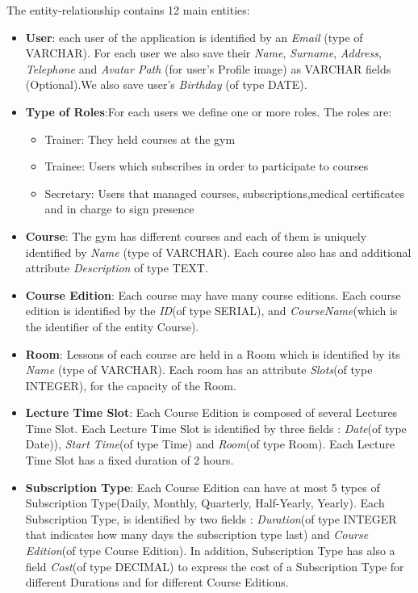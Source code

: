     The entity-relationship contains 12 main entities:
    \begin{itemize}
        \item 
        \textbf{User}: each user of the application is identified by an \textit{Email} (type of VARCHAR). 
    	For each user we also save their \textit{Name}, \textit{Surname}, \textit{Address}, \textit{Telephone} and \textit{Avatar Path} (for user's Profile image) as VARCHAR fields (Optional).We also save user's \textit{Birthday} (of type DATE). 
    	
    	\item 
    	\textbf{Type of Roles}:For each users we define
        one or more roles. The roles are:
        \begin{itemize}
			\item Trainer: They held courses at the gym 
			\item Trainee: Users which subscribes in order to participate to courses
			\item Secretary: Users that managed courses, subscriptions,medical certificates and in charge to sign presence
        \end{itemize}
    	
    	\item \textbf{Course}: The gym has different courses and each of them is uniquely identified by \textit{Name} (type of VARCHAR). Each course also has and additional attribute \textit{Description} of type TEXT.
    	
    	\item \textbf{Course Edition}: Each course may have many course editions. Each course edition is identified by the \textit{ID}(of type SERIAL), and \textit{CourseName}(which is the identifier of the entity Course).
    	
    	\item \textbf{Room}: Lessons of each course are held in a Room which is identified by its \textit{Name} (type of VARCHAR). Each room has an attribute \textit{Slots}(of type INTEGER), for the capacity of the Room.
    	
    	\item \textbf{Lecture Time Slot}: Each Course Edition is composed of several Lectures Time Slot. Each Lecture Time Slot is identified by three fields : \textit{Date}(of type Date)), \textit{Start Time}(of type Time) and \textit{Room}(of type Room). Each Lecture Time Slot has a fixed duration of 2 hours.
    	
    	\item \textbf{Subscription Type}: Each Course Edition can have at most 5 types of Subscription Type(Daily, Monthly, Quarterly, Half-Yearly, Yearly). Each Subscription Type, is identified by two fields : \textit{Duration}(of type INTEGER that indicates how many days the subscription type last) and \textit{Course Edition}(of type Course Edition). In addition, Subscription Type has also a field \textit{Cost}(of type DECIMAL) to express the cost of a Subscription Type for different Durations and for different Course Editions.
    	

\end{itemize}
